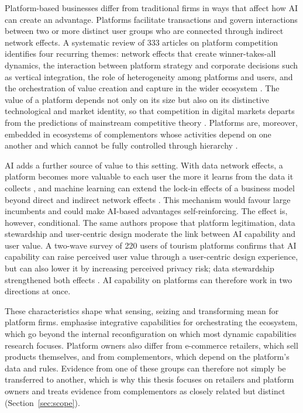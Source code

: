 Platform-based businesses differ from traditional firms in ways that affect how AI can create an advantage. Platforms facilitate transactions and govern interactions between two or more distinct user groups who are connected through indirect network effects. A systematic review of 333 articles on platform competition identifies four recurring themes: network effects that create winner-takes-all dynamics, the interaction between platform strategy and corporate decisions such as vertical integration, the role of heterogeneity among platforms and users, and the orchestration of value creation and capture in the wider ecosystem \parencite{rietveld2021}. The value of a platform depends not only on its size but also on its distinctive technological and market identity, so that competition in digital markets departs from the predictions of mainstream competitive theory \parencite{cennamo2021}. Platforms are, moreover, embedded in ecosystems of complementors whose activities depend on one another and which cannot be fully controlled through hierarchy \parencite{jacobides2018}.

AI adds a further source of value to this setting. With data network effects, a platform becomes more valuable to each user the more it learns from the data it collects \parencite{gregory2021}, and machine learning can extend the lock-in effects of a business model beyond direct and indirect network effects \parencite{haftor2021}. This mechanism would favour large incumbents and could make AI-based advantages self-reinforcing. The effect is, however, conditional. The same authors propose that platform legitimation, data stewardship and user-centric design moderate the link between AI capability and user value. A two-wave survey of 220 users of tourism platforms confirms that AI capability can raise perceived user value through a user-centric design experience, but can also lower it by increasing perceived privacy risk; data stewardship strengthened both effects \parencite{yu2026}. AI capability on platforms can therefore work in two directions at once.

These characteristics shape what sensing, seizing and transforming mean for platform firms. \textcite{helfat2018} emphasise integrative capabilities for orchestrating the ecosystem, which go beyond the internal reconfiguration on which most dynamic capabilities research focuses. Platform owners also differ from e-commerce retailers, which sell products themselves, and from complementors, which depend on the platform's data and rules. Evidence from one of these groups can therefore not simply be transferred to another, which is why this thesis focuses on retailers and platform owners and treats evidence from complementors as closely related but distinct (Section~\ref{sec:scope}).

